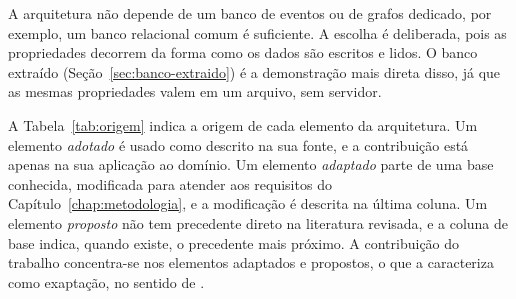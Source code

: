 A arquitetura não depende de um banco de eventos ou de grafos dedicado, por exemplo, um banco relacional comum é suficiente. A escolha é deliberada, pois as propriedades decorrem da forma como os dados são escritos e lidos. O banco extraído (Seção~\ref{sec:banco-extraido}) é a demonstração mais direta disso, já que as mesmas propriedades valem em um arquivo, sem servidor.

A Tabela~\ref{tab:origem} indica a origem de cada elemento da arquitetura. Um elemento \emph{adotado} é usado como descrito na sua fonte, e a contribuição está apenas na sua aplicação ao domínio. Um elemento \emph{adaptado} parte de uma base conhecida, modificada para atender aos requisitos do Capítulo~\ref{chap:metodologia}, e a modificação é descrita na última coluna. Um elemento \emph{proposto} não tem precedente direto na literatura revisada, e a coluna de base indica, quando existe, o precedente mais próximo. A contribuição do trabalho concentra-se nos elementos adaptados e propostos, o que a caracteriza como exaptação, no sentido de .

